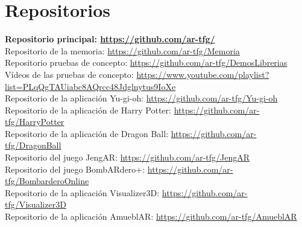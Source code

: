 \chapter*{Repositorios}
\textbf{Repositorio principal: \url{https://github.com/ar-tfg/}}\\

Repositorio de la memoria: \url{https://github.com/ar-tfg/Memoria}\\

Repositorio pruebas de concepto: \url{https://github.com/ar-tfg/DemosLibrerias}\\

Vídeos de las pruebas de concepto: \url{https://www.youtube.com/playlist?list=PLqQgTAUiabc8AQrcc48Jdglnytus9IoXe}\\

Repositorio de la aplicación Yu-gi-oh: \url{https://github.com/ar-tfg/Yu-gi-oh}\\

Repositorio de la aplicación de Harry Potter: \url{https://github.com/ar-tfg/HarryPotter}\\

Repositorio de la aplicación de Dragon Ball: \url{https://github.com/ar-tfg/DragonBall}\\

Repositorio del juego JengAR: \url{https://github.com/ar-tfg/JengAR}\\

Repositorio del juego BombARdero+: \url{https://github.com/ar-tfg/BombarderoOnline}\\

Repositorio de la aplicación Visualizer3D: \url{https://github.com/ar-tfg/Visualizer3D}\\

Repositorio de la aplicación AmueblAR: \url{https://github.com/ar-tfg/AmueblAR}\\
